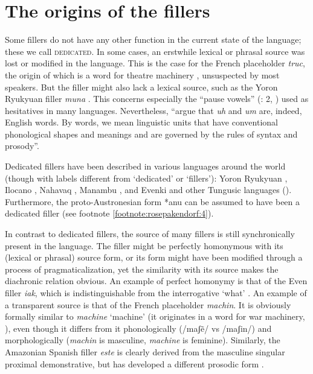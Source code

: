 \documentclass[output=paper]{langscibook}
\begin{document}
\section{The origins of the fillers}\label{sec:intro:3}

Some fillers do not have any other function in the current state of the language; these we call \textsc{dedicated}. In some cases, an erstwhile lexical or phrasal source was lost or modified in the language. This is the case for the French placeholder \textit{truc}, the origin of which is a word for theatre machinery \citep{Mihatsch2006}, unsuspected by most speakers. But the filler might also lack a lexical source, such as the Yoron Ryukyuan filler \textit{muna} \citep{Seraku2020}. This concerns especially the “pause vowels” (\citealt{Fox2010}: 2, \citealt{Candea2005}) used as hesitatives in many languages. Nevertheless, \citet[75]{Clark2002} “argue that \textit{uh} and \textit{um} are, indeed, English words. By words, we mean linguistic units that have conventional phonological shapes and meanings and are governed by the rules of syntax and prosody”. 

Dedicated fillers have been described in various languages around the world (though with labels different from ‘dedicated’ or ‘fillers’): Yoron Ryukyuan \citep{Seraku2020}, Ilocano \citep[656--661]{Rubino1996}, Nahavaq \citep[130--131]{Dimock2010}, Manambu \citep[571--578]{Aikhenvald2008}, and Evenki and other Tungusic languages (\citealt{Klyachko2022, chapters/klyachko}). Furthermore, the proto-Austronesian form *anu can be assumed to have been a dedicated filler (see footnote \ref{footnote:rosepakendorf:4}).

In contrast to dedicated fillers, the source of many fillers is still synchronically present in the language. The filler might be perfectly homonymous with its (lexical or phrasal) source form, or its form might have been modified through a process of pragmaticalization, yet the similarity with its source makes the diachronic relation obvious. An example of perfect homonymy is that of the Even filler \textit{iak}, which is indistinguishable from the interrogative ‘what’ \citep{Matić2008}. An example of a transparent source is that of the French placeholder \textit{machin}. It is obviously formally similar to \textit{machine} ‘machine’ (it originates in a word for war machinery, \citealt{Mihatsch2006}), even though it differs from it phonologically (/maʃẽ/ vs /maʃin/) and morphologically (\textit{machin} is masculine, \textit{machine} is feminine). Similarly, the Amazonian Spanish filler \textit{este} is clearly derived from the masculine singular proximal demonstrative, but has developed a different prosodic form \citep{Vallejos-yopan2023}.
\end{document}
